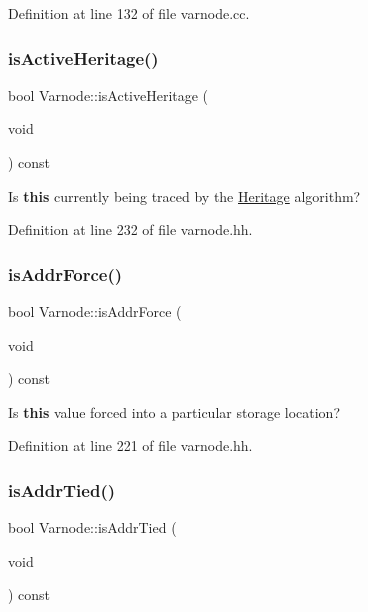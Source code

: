 Definition at line 132 of file varnode.\+cc.

\mbox{\label{class_varnode_a0ecb41601b665957bd9a832b3455a9be}} 
\subsubsection{\texorpdfstring{isActiveHeritage()}{isActiveHeritage()}}
{\footnotesize\ttfamily bool Varnode\+::is\+Active\+Heritage (\begin{DoxyParamCaption}\item[{void}]{ }\end{DoxyParamCaption}) const\hspace{0.3cm}{\ttfamily [inline]}}



Is {\bfseries{this}} currently being traced by the \mbox{\hyperlink{class_heritage}{Heritage}} algorithm? 



Definition at line 232 of file varnode.\+hh.

\mbox{\label{class_varnode_abbc8f37343674a6b64cd7910b9cfee25}} 
\subsubsection{\texorpdfstring{isAddrForce()}{isAddrForce()}}
{\footnotesize\ttfamily bool Varnode\+::is\+Addr\+Force (\begin{DoxyParamCaption}\item[{void}]{ }\end{DoxyParamCaption}) const\hspace{0.3cm}{\ttfamily [inline]}}



Is {\bfseries{this}} value forced into a particular storage location? 



Definition at line 221 of file varnode.\+hh.

\mbox{\label{class_varnode_a61fd3ac206edbb80a9c42f3b69755b61}} 
\subsubsection{\texorpdfstring{isAddrTied()}{isAddrTied()}}
{\footnotesize\ttfamily bool Varnode\+::is\+Addr\+Tied (\begin{DoxyParamCaption}\item[{void}]{ }\end{DoxyParamCaption}) const\hspace{0.3cm}{\ttfamily [inline]}}



